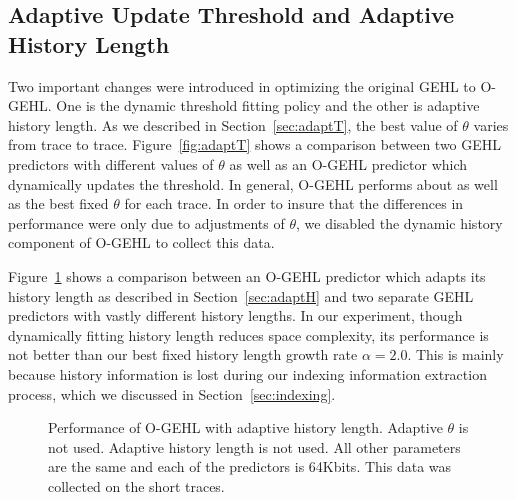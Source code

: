 \subsection{Adaptive Update Threshold and Adaptive History Length}
Two important changes were introduced in optimizing the original GEHL to O-GEHL.  One is the dynamic threshold fitting policy and the other is adaptive history length.  As we described in Section~\ref{sec:adaptT}, the best value of $\theta$ varies from trace to trace. Figure~\ref{fig:adaptT} shows a comparison between two GEHL predictors with different values of $\theta$ as well as an O-GEHL predictor which dynamically updates the threshold.  In general, O-GEHL performs about as well as the best fixed $\theta$ for each trace. In order to insure that the differences in performance were only due to adjustments of $\theta$, we disabled the dynamic history component of O-GEHL to collect this data.

Figure~\ref{fig:adaptH} shows a comparison between an O-GEHL predictor which adapts its history length as described in Section~\ref{sec:adaptH} and two separate GEHL predictors with vastly different history lengths.  In our experiment, though dynamically fitting history length reduces space complexity, its performance is not better than our best fixed history length growth rate $\alpha=2.0$. This is mainly because history information is lost during our indexing information extraction process, which we discussed in Section~\ref{sec:indexing}.

\begin{figure}[h]
  \centering

  \caption{Performance of O-GEHL with adaptive history length.  Adaptive $\theta$ is not used.  Adaptive history length is not used. All other parameters are the same and each of the predictors is 64Kbits.  This data was collected on the short traces.}
 \label{fig:adaptH}
\end{figure}

